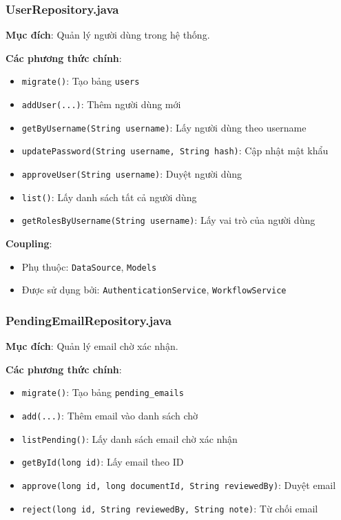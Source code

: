 \documentclass[12pt,a4paper]{article}
\begin{document}
\subsubsection{UserRepository.java}
\textbf{Mục đích}: Quản lý người dùng trong hệ thống.

\textbf{Các phương thức chính}:
\begin{itemize}
    \item \texttt{migrate()}: Tạo bảng \texttt{users}
    \item \texttt{addUser(...)}: Thêm người dùng mới
    \item \texttt{getByUsername(String username)}: Lấy người dùng theo username
    \item \texttt{updatePassword(String username, String hash)}: Cập nhật mật khẩu
    \item \texttt{approveUser(String username)}: Duyệt người dùng
    \item \texttt{list()}: Lấy danh sách tất cả người dùng
    \item \texttt{getRolesByUsername(String username)}: Lấy vai trò của người dùng
\end{itemize}

\textbf{Coupling}:
\begin{itemize}
    \item Phụ thuộc: \texttt{DataSource}, \texttt{Models}
    \item Được sử dụng bởi: \texttt{AuthenticationService}, \texttt{WorkflowService}
\end{itemize}

\subsubsection{PendingEmailRepository.java}
\textbf{Mục đích}: Quản lý email chờ xác nhận.

\textbf{Các phương thức chính}:
\begin{itemize}
    \item \texttt{migrate()}: Tạo bảng \texttt{pending\_emails}
    \item \texttt{add(...)}: Thêm email vào danh sách chờ
    \item \texttt{listPending()}: Lấy danh sách email chờ xác nhận
    \item \texttt{getById(long id)}: Lấy email theo ID
    \item \texttt{approve(long id, long documentId, String reviewedBy)}: Duyệt email
    \item \texttt{reject(long id, String reviewedBy, String note)}: Từ chối email
\end{itemize}
\end{document}
